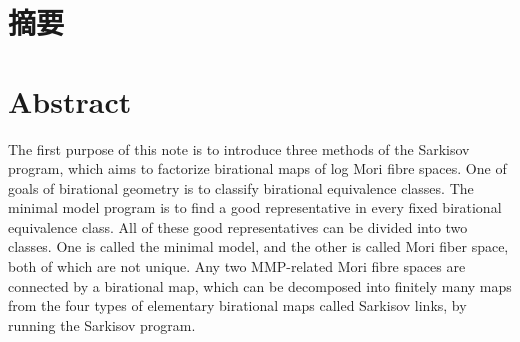 

\maketitle%
\MAKETITLE%
\makedeclaration%
\intobmk\chapter*{摘\quad 要}%
\setcounter{page}{1}%


\intobmk\chapter*{Abstract}%

The first purpose of this note is to introduce three methods of the Sarkisov program, which aims to factorize birational maps of log Mori fibre spaces. 
One of goals of birational geometry is to classify birational equivalence classes. The minimal model program  is to find a good representative in every fixed birational equivalence class. 
All of these good representatives can be divided into two classes. One is called the minimal model, and the other is called Mori fiber space, both of  which are not unique. 
Any two MMP-related Mori fibre spaces are connected by a birational map, which can be decomposed into finitely many maps from the four types of elementary birational maps called Sarkisov links, by running the Sarkisov program. 


\pagestyle{enfrontmatterstyle}%
\cleardoublepage\pagestyle{frontmatterstyle}%

